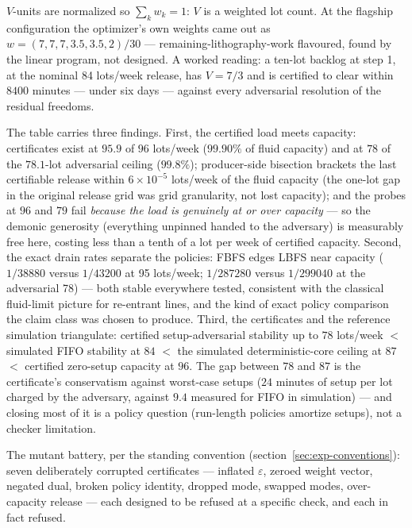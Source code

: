 $V$-units are normalized so $\sum_k w_k = 1$: $V$ is a weighted lot
count. At the flagship configuration the optimizer's own weights came
out as $w = (7, 7, 7, 3.5, 3.5, 2)/30$ --- remaining-lithography-work
flavoured, found by the linear program, not designed. A worked
reading: a ten-lot backlog at step 1, at the nominal 84 lots/week
release, has $V = 7/3$ and is certified to clear within $8400$
minutes --- under six days --- against every adversarial resolution
of the residual freedoms.

The table carries three findings. First, the certified load meets
capacity: certificates exist at $95.9$ of $96$ lots/week ($99.90\%$
of fluid capacity) and at $78$ of the $78.1$-lot adversarial ceiling
($99.8\%$); producer-side bisection brackets the last certifiable
release within $6 \times 10^{-5}$ lots/week of the fluid capacity
(the one-lot gap in the original release grid was grid granularity,
not lost capacity); and the probes at $96$ and $79$ fail
\emph{because the load is genuinely at or over capacity} --- so the
demonic generosity (everything unpinned handed to the adversary) is
measurably free here, costing less than a tenth of a lot per week of
certified capacity. Second, the exact drain rates
separate the policies: FBFS edges LBFS near capacity ($1/38880$
versus $1/43200$ at 95 lots/week; $1/287280$ versus $1/299040$ at
the adversarial 78) --- both stable everywhere tested, consistent
with the classical fluid-limit picture for re-entrant lines, and the
kind of exact policy comparison the claim class was chosen to
produce. Third, the certificates and the reference simulation
triangulate: certified setup-adversarial stability up to $78$
lots/week $<$ simulated FIFO stability at $84$ $<$ the simulated
deterministic-core ceiling at $87$ $<$ certified zero-setup capacity
at $96$. The gap between $78$ and $87$ is the certificate's
conservatism against worst-case setups ($24$ minutes of setup per
lot charged by the adversary, against $9.4$ measured for FIFO in
simulation) --- and closing most of it is a policy question
(run-length policies amortize setups), not a checker limitation.

The mutant battery, per the standing convention
(section~\ref{sec:exp-conventions}): seven deliberately corrupted
certificates --- inflated $\varepsilon$, zeroed weight vector,
negated dual, broken policy identity, dropped mode, swapped modes,
over-capacity release --- each designed to be refused at a specific
check, and each in fact refused.

